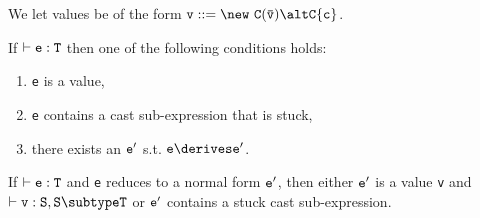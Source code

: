 We let values be of the form $\tt v ::= \new\ C(\bar{\tt v}) \alt C\{c\}$.

\begin{theorem}[Progress]
If $\vdash {\tt e:T}$ then one of the following conditions holds:
\begin{enumerate}
\item {\tt e} is a value,
\item {\tt e} contains a cast sub-expression that is stuck,
\item there exists an $\tt e'$ s.t. $\tt e\derives e'$.
\end{enumerate}
\end{theorem}

\begin{theorem}
If $\vdash {\tt e:T}$ and {\tt e}
reduces to a normal form ${\tt e'}$, then
either $\tt e'$ is a value {\tt v} and $\vdash {\tt v:S},{\tt S\subtype T}$ or
${\tt e'}$ contains  a stuck cast sub-expression.
\end{theorem}






